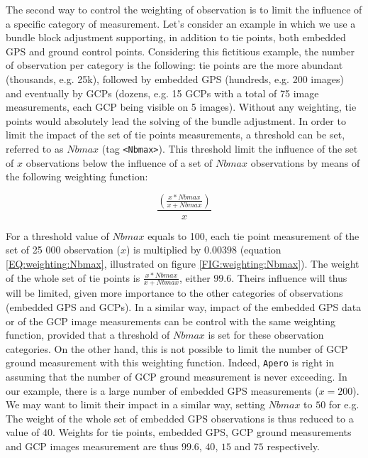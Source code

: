 The second way to control the weighting of observation is to limit the influence of a specific category of measurement. 
Let's consider an example in which we use a bundle block adjustment supporting, in addition to tie points, both embedded GPS and ground control points. 
Considering this fictitious example, the number of observation per category is the following: tie points are the more abundant (thousands, e.g. 25k), followed by embedded GPS (hundreds, e.g. 200 images) and eventually by GCPs (dozens, e.g. 15 GCPs with a total of 75 image measurements, each GCP being visible on 5 images).
Without any weighting, tie points would absolutely lead the solving of the bundle adjustment. 
In order to limit the impact of the set of tie points measurements, a threshold can be set, referred to as $Nbmax$ (tag {\tt <Nbmax>}). 
This threshold limit the influence of the set of $x$ observations below the influence of a set of $Nbmax$ observations by means of the following weighting function:

\begin{equation}
   \label{EQ:weighting:Nbmax}
     \frac{(\frac{x*Nbmax}{x+Nbmax})}{x}
\end{equation}

For a threshold value of $Nbmax$ equals to 100, each tie point measurement of the set of 25 000 observation ($x$) is multiplied by $0.00398$ (equation \ref{EQ:weighting:Nbmax}, illustrated on figure \ref{FIG:weighting:Nbmax}). 
The weight of the whole set of tie points is $\frac{x*Nbmax}{x+Nbmax}$, either $99.6$.
Theirs influence will thus will be limited, given more importance to the other categories of observations (embedded GPS and GCPs). 
In a similar way, impact of the embedded GPS data or of the GCP image measurements can be control with the same weighting function, provided that a threshold of $Nbmax$ is set for these observation categories.
On the other hand, this is not possible to limit the number of GCP ground measurement with this weighting function. 
Indeed, {\tt Apero} is right in assuming that the number of GCP ground measurement is never exceeding.
In our example, there is a large number of embedded GPS measurements ($x= 200$). We may want to limit their impact in a similar way, setting $Nbmax$ to $50$ for e.g. 
The weight of the whole set of embedded GPS observations is thus reduced to a value of $40$. 
Weights for tie points, embedded GPS, GCP ground measurements and GCP images measurement are thus $99.6$, $40$, $15$ and $75$ respectively.

